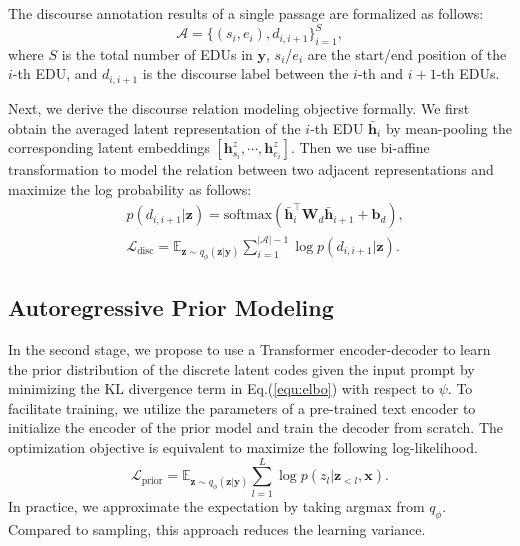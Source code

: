 \documentclass[11pt]{article}
\begin{document}

The discourse annotation results of a single passage are formalized as follows:
\begin{equation}
    \mathcal{A} = \{(s_i,e_i), d_{i,i+1}\}_{i=1}^{S},
\end{equation}
where $S$ is the total number of EDUs in $\boldsymbol{y}$,
$s_i$/$e_i$ are the start/end position of the $i$-th EDU, and $d_{i,i+1}$ is the discourse label between the $i$-th and $i+1$-th EDUs. 

Next, we derive the discourse relation modeling objective formally.
We first obtain the averaged latent representation of the $i$-th EDU $\bar{\boldsymbol{h}}_i$ by mean-pooling the corresponding latent embeddings $[\boldsymbol{h}^z_{s_i},\cdots, \boldsymbol{h}^z_{e_i}]$. Then we use bi-affine transformation to model the relation between two adjacent representations and maximize the log probability as follows:
\begin{align}
    &p(d_{i,i+1}|\boldsymbol{z}) = \text{softmax}(\bar{\boldsymbol{h}}_i^\top \boldsymbol{W}_{d} \bar{\boldsymbol{h}}_{i+1} + \boldsymbol{b}_d),\\
    &\mathcal{L}_{\text{disc}} = \mathbb{E}_{\boldsymbol{z}\sim q_\phi(\boldsymbol{z}|\boldsymbol{y})} \sum_{i=1}^{|\mathcal{A}|-1} \log p(d_{i,i+1}|\boldsymbol{z}).
\end{align}



\subsection{Autoregressive Prior Modeling}\label{sec:stage2}

In the second stage, we propose to use a Transformer encoder-decoder to learn the prior distribution of the discrete latent codes given the input prompt by minimizing the KL divergence term in Eq.(\ref{equ:elbo}) with respect to $\psi$. To facilitate training, we utilize the parameters of a pre-trained text encoder to initialize the encoder of the prior model and train the decoder from scratch. The optimization objective is equivalent to maximize the following log-likelihood.
\begin{equation}
    \mathcal{L}_{\text{prior}} = \mathbb{E}_{\boldsymbol{z}\sim q_\phi(\boldsymbol{z}|\boldsymbol{y})} \sum_{l=1}^L \log p({z}_l|\boldsymbol{z}_{<l}, \boldsymbol{x}).
\end{equation}
In practice, we approximate the expectation by taking argmax from $q_\phi$. Compared to sampling, this approach reduces the learning variance.
\end{document}
